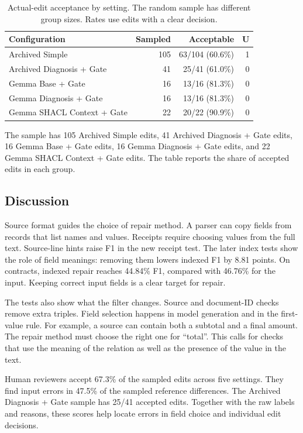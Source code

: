 \begin{table}[t]
\centering
\caption{Actual-edit acceptance by setting. The random sample has different group sizes. Rates use edits with a clear decision.}
\label{tab:human_review_by_config}
\small
\begin{tabular}{lrrr}
\toprule
Configuration & Sampled & Acceptable & U \\
\midrule
Archived Simple & 105 & 63/104 (60.6\%) & 1 \\
Archived Diagnosis + Gate & 41 & 25/41 (61.0\%) & 0 \\
Gemma Base + Gate & 16 & 13/16 (81.3\%) & 0 \\
Gemma Diagnosis + Gate & 16 & 13/16 (81.3\%) & 0 \\
Gemma SHACL Context + Gate & 22 & 20/22 (90.9\%) & 0 \\
\bottomrule
\end{tabular}
\end{table}

The sample has 105 Archived Simple edits, 41 Archived Diagnosis + Gate
edits, 16 Gemma Base + Gate edits, 16 Gemma Diagnosis + Gate edits,
and 22 Gemma SHACL Context + Gate edits.
The table reports the share of accepted edits in each group.

\subsection{Discussion}
\label{sec:eval:failure}

Source format guides the choice of repair method.
A parser can copy fields from records that list names and values.
Receipts require choosing values from the full text. Source-line hints
raise F1 in the new receipt test. The later index tests show the role of
field meanings: removing them lowers indexed F1 by 8.81 points.
On contracts, indexed repair reaches 44.84\% F1, compared with 46.76\%
for the input. Keeping correct input fields is a clear target for repair.

The tests also show what the filter changes. Source and document-ID checks
remove extra triples. Field selection happens in model generation and in
the first-value rule. For example, a source can contain both a subtotal
and a final amount. The repair method must choose the right one for ``total''.
This calls for checks that use the meaning of the relation as well as the
presence of the value in the text.

Human reviewers accept 67.3\% of the sampled edits across five settings.
They find input errors in 47.5\% of the sampled reference differences.
The Archived Diagnosis + Gate sample has 25/41 accepted edits.
Together with the raw labels and reasons, these scores help locate errors
in field choice and individual edit decisions.

